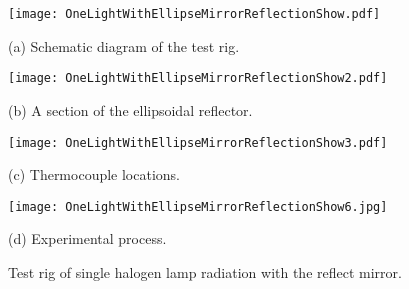 \begin{figure}[ht]
  \begin{minipage}[t]{0.5\linewidth} %
  \nonumber
    \centering
    \texttt{[image: OneLightWithEllipseMirrorReflectionShow.pdf]}
    \centerline{(a) Schematic diagram of the test rig.}
    \label{Fig:OneLightWithEllipseMirrorReflectionShow}
  \end{minipage}%
  \begin{minipage}[t]{0.5\linewidth}
    \centering
    \texttt{[image: OneLightWithEllipseMirrorReflectionShow2.pdf]}
    \centerline{(b) A section of the ellipsoidal reflector.}
    \label{Fig:OneLightWithEllipseMirrorReflectionShow2}
  \end{minipage}

  \begin{minipage}[t]{0.5\linewidth} %
  \nonumber
    \centering
    \texttt{[image: OneLightWithEllipseMirrorReflectionShow3.pdf]}
    \centerline{(c) Thermocouple locations.}
    \label{Fig:OneLightWithEllipseMirrorReflectionShow3}
  \end{minipage}%
  \begin{minipage}[t]{0.5\linewidth}
    \centering
    \texttt{[image: OneLightWithEllipseMirrorReflectionShow6.jpg]}
    \centerline{(d) Experimental process.}
    \label{Fig:OneLightWithEllipseMirrorReflectionShow6}
  \end{minipage}


  \caption{Test rig of single halogen lamp radiation with the reflect mirror.}
  \label{Fig:OneLightWithEllipseMirrorReflectionShow}
\end{figure}


